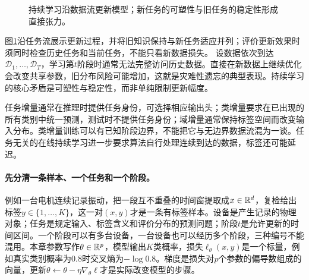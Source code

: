 \begin{figure}[htbp]
\centering
{}
\caption{持续学习沿数据流更新模型；新任务的可塑性与旧任务的稳定性形成直接张力。}
\label{fig:continual-stability-plasticity}
\end{figure}
图\ref{fig:continual-stability-plasticity}沿任务流展示更新过程，并将旧知识保持与新任务适应并列；评价更新效果时须同时检查历史任务和当前任务，不能只看新数据损失。
设数据依次到达$\mathcal D_1,\ldots,\mathcal D_T$，学习第$t$阶段时通常无法完整访问历史数据。直接在新数据上继续优化会改变共享参数，旧分布风险可能增加，这就是灾难性遗忘的典型表现。持续学习的核心矛盾是可塑性与稳定性，而非单纯限制更新幅度\cite{delange2022continual}。

任务增量通常在推理时提供任务身份，可选择相应输出头；类增量要求在已出现的所有类别中统一预测，测试时不提供任务身份；域增量通常保持标签空间而改变输入分布。类增量训练可以有已知阶段边界，不能把它与无边界数据流混为一谈。任务无关的在线持续学习进一步要求算法自行处理连续到达的数据，标签还可能延迟。

\paragraph{先分清一条样本、一个任务和一个阶段。}
例如一台电机连续记录振动，把一段互不重叠的时间窗提取成$x\in\mathbb{R}^d$，复检给出标签$y\in\{1,\ldots,K\}$，这一对$(x,y)$才是一条有标签样本。设备是产生记录的物理对象；任务是规定输入、标签含义和评价分布的预测问题；阶段$t$是允许更新的时间区间。一个阶段可以有多台设备，一台设备也可以经历多个阶段，三种编号不能混用。本章参数写作$\theta\in\mathbb{R}^p$，模型输出$K$类概率，损失$\ell_\theta(x,y)$是一个标量，例如真实类别概率为$0.8$时交叉熵为$-\log0.8$。梯度是损失对$p$个参数的偏导数组成的向量，更新$\theta\leftarrow\theta-\eta\nabla_\theta\ell$才是实际改变模型的步骤。

